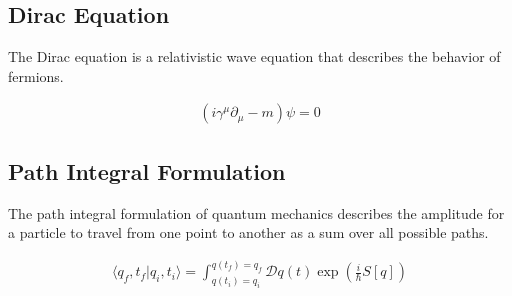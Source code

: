 \documentclass{article}
\begin{document}
\subsection*{Dirac Equation}

The Dirac equation is a relativistic wave equation that describes the behavior of fermions.

\begin{align}
(i\gamma^\mu \partial_\mu - m)\psi = 0
\end{align}


\subsection*{Path Integral Formulation}

The path integral formulation of quantum mechanics describes the amplitude for a particle to travel from one point to another as a sum over all possible paths.

\begin{align}
\langle q_f, t_f | q_i, t_i \rangle = \int_{q(t_i)=q_i}^{q(t_f)=q_f} \mathcal{D}q(t) \exp\left(\frac{i}{\hbar}S[q]\right)
\end{align}
\end{document}
